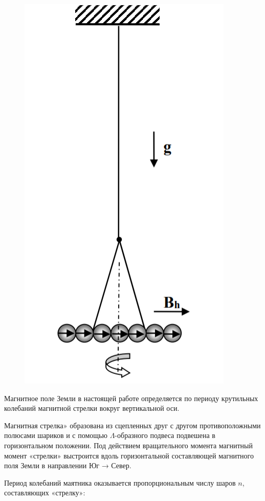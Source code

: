\documentclass[a4paper,12pt]{article} %
\begin{document}
\begin{figure}[h!]
	\centering
	\includegraphics[scale=0.7]{Гор.png}
\end{figure}

Магнитное поле Земли в настоящей работе определяется по периоду крутильных колебаний магнитной стрелки вокруг вертикальной оси.

Магнитная стрелка» образована из сцепленных друг с другом противоположными полюсами шариков и с помощью $\Lambda$-образного подвеса подвешена в горизонтальном положении. Под действием вращательного момента магнитный момент «стрелки» выстроится вдоль горизонтальной составляющей магнитного поля Земли в направлении Юг → Север.

Период колебаний маятника оказывается пропорциональным числу шаров $n$, составляющих «стрелку»:
\end{document}

